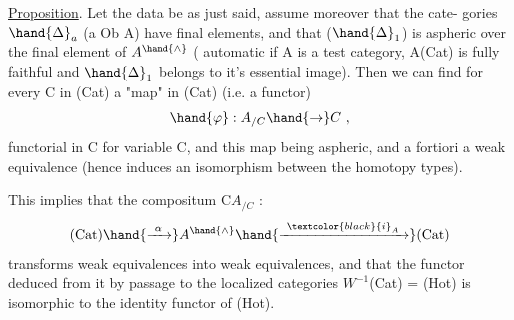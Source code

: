 \uline{Proposition}.  Let the data be as just said,  assume moreover that the cate-%
gories $\hand{\ensuremath{\Delta}}_{a}$ (a \hand{\ensuremath{\in}} Ob A) have final elements,  and that \hand{\ensuremath{\alpha}}($\hand{\ensuremath{\Delta}}_{1}$) is aspheric
over the final element of $A^{\hand{\wedge}}$  ( automatic if A is a test category,
A\hand{\ensuremath{\longrightarrow}}(Cat) is fully faithful and $\hand{\ensuremath{\Delta}}_{1}$ belongs to it's essential image). Then
we can find for every C in (Cat) a  "map" in (Cat) (i.e. a functor)
\margin{(*)} \[ \hand{\ensuremath{\varphi}} : A_{/C} \hand{\ensuremath{\to}} C \ , \]
functorial in C for variable C,  and this map being 
aspheric,  and a fortiori a weak equivalence (hence induces an isomorphism
between the homotopy types).

This implies that the compositum  C\hand{\ensuremath{\mapsto}}$A_{/C}$  :
\[ (\mathrm{Cat}) \hand{\ensuremath{\xrightarrow{\ \alpha\ }}} A^{\hand{\wedge}} \hand{\ensuremath{\xrightarrow{\ \textcolor{black}{i}_{A}\ }}} (\mathrm{Cat}) \]
transforms weak equivalences into weak equivalences,  and that the functor
deduced from it by passage to the localized categories  $W^{-1}$(Cat) = (Hot)
is isomorphic to the identity functor of (Hot).
